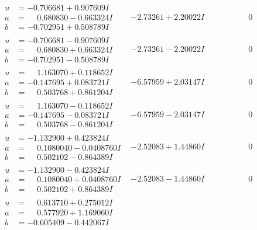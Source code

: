 \documentclass[1p]{elsarticle_modified}
\theoremstyle{definition}
\begin{document}
$$\begin{array}{c|c|c}
\begin{aligned}
u &= -0.706681 + 0.907609 I \\
a &= \phantom{-}0.680830 - 0.663324 I \\
b &= -0.702951 + 0.508789 I\end{aligned}
 & -2.73261 + 2.20022 I & \phantom{-0.000000 } 0 \\ \hline\begin{aligned}
u &= -0.706681 - 0.907609 I \\
a &= \phantom{-}0.680830 + 0.663324 I \\
b &= -0.702951 - 0.508789 I\end{aligned}
 & -2.73261 - 2.20022 I & \phantom{-0.000000 } 0 \\ \hline\begin{aligned}
u &= \phantom{-}1.163070 + 0.118652 I \\
a &= -0.147695 + 0.083721 I \\
b &= \phantom{-}0.503768 + 0.861204 I\end{aligned}
 & -6.57959 + 2.03147 I & \phantom{-0.000000 } 0 \\ \hline\begin{aligned}
u &= \phantom{-}1.163070 - 0.118652 I \\
a &= -0.147695 - 0.083721 I \\
b &= \phantom{-}0.503768 - 0.861204 I\end{aligned}
 & -6.57959 - 2.03147 I & \phantom{-0.000000 } 0 \\ \hline\begin{aligned}
u &= -1.132900 + 0.423824 I \\
a &= \phantom{-}0.1080040 - 0.0408760 I \\
b &= \phantom{-}0.502102 - 0.864389 I\end{aligned}
 & -2.52083 + 1.44860 I & \phantom{-0.000000 } 0 \\ \hline\begin{aligned}
u &= -1.132900 - 0.423824 I \\
a &= \phantom{-}0.1080040 + 0.0408760 I \\
b &= \phantom{-}0.502102 + 0.864389 I\end{aligned}
 & -2.52083 - 1.44860 I & \phantom{-0.000000 } 0 \\ \hline\begin{aligned}
u &= \phantom{-}0.613710 + 0.275012 I \\
a &= \phantom{-}0.577920 + 1.169060 I \\
b &= -0.605409 - 0.442067 I\end{aligned}

\end{array}$$
\end{document}
